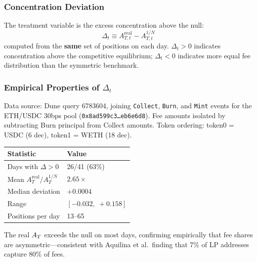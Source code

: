 \subsubsection{Concentration Deviation}

\begin{definition}\label{def:econ-deviation}
The treatment variable is the excess concentration above the null:
\begin{equation}\label{eq:econ-deviation}
  \Delta_t \equiv A_{T,t}^{\text{real}} - A_{T,t}^{1/N}
\end{equation}
computed from the \textbf{same} set of positions on each day.
$\Delta_t > 0$ indicates concentration above the competitive equilibrium;
$\Delta_t < 0$ indicates more equal fee distribution than the symmetric
benchmark.
\end{definition}

\subsubsection{Empirical Properties of $\Delta_t$}

Data source: Dune query 6783604, joining \texttt{Collect}, \texttt{Burn}, and
\texttt{Mint} events for the ETH/USDC 30bps pool
(\texttt{0x8ad599c3\ldots eb6e6d8}). Fee amounts isolated by subtracting Burn
principal from Collect amounts. Token ordering: token0 = USDC (6 dec),
token1 = WETH (18 dec).

\begin{center}
\begin{tabular}{@{}ll@{}}
\toprule
Statistic & Value \\
\midrule
Days with $\Delta > 0$ & 26/41 (63\%) \\
Mean $A_T^{\text{real}} / A_T^{1/N}$ & $2.65\times$ \\
Median deviation & $+0.0004$ \\
Range & $[-0.032,\; +0.158]$ \\
Positions per day & 13--65 \\
\bottomrule
\end{tabular}
\end{center}

The real $A_T$ exceeds the null on most days, confirming empirically that fee
shares are asymmetric---consistent with Aquilina et al.\ finding that 7\% of
LP addresses capture 80\% of fees.


